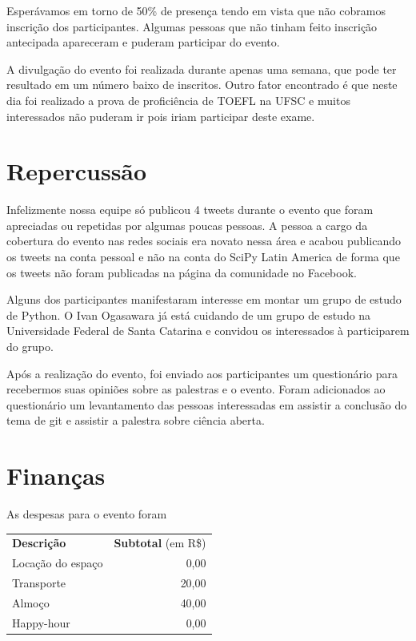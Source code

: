\documentclass[12pt]{article}
\begin{document}
Esperávamos em torno de 50\% de presença tendo em vista que não cobramos
inscrição dos participantes.
Algumas pessoas que não tinham feito inscrição antecipada apareceram e puderam
participar do evento.

A divulgação do evento foi realizada durante apenas uma semana, que pode ter resultado em um número
baixo de inscritos. Outro fator encontrado é que neste dia foi realizado a prova de proficiência de
TOEFL na UFSC e muitos interessados não puderam ir pois iriam participar deste exame.
\newpage

\section*{Repercussão}

Infelizmente nossa equipe só publicou 4 tweets durante o evento que foram
apreciadas ou repetidas por algumas poucas pessoas.
A pessoa a cargo da cobertura do evento nas redes sociais era novato nessa área
e acabou publicando os tweets na conta pessoal e não na conta do SciPy Latin
America de forma que os tweets não foram publicadas na página da comunidade no
Facebook.

Alguns dos participantes manifestaram interesse em montar um grupo de estudo de Python. O Ivan
Ogasawara já está cuidando de um grupo de estudo na Universidade Federal de Santa Catarina e
convidou os interessados à participarem do grupo.

Após a realização do evento, foi enviado aos participantes um questionário para recebermos suas
opiniões sobre as palestras e o evento. Foram adicionados ao questionário um levantamento das
pessoas interessadas em assistir a conclusão do tema de git e assistir a palestra sobre ciência
aberta.


\newpage

\section*{Finanças}

As despesas para o evento foram

\begin{tabular}{p{}r}
  \textbf{Descrição} & \textbf{Subtotal} (em R\$) \\
  Locação do espaço & 0,00 \\
  Transporte & 20,00 \\ %
  Almoço & 40,00 \\ %
  Happy-hour & 0,00 \\ %
\end{tabular}
\end{document}
